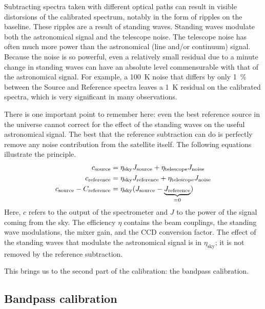 Subtracting spectra taken with different optical paths can result in visible distorsions of the calibrated spectrum, notably in the form of ripples on the baseline.
These ripples are a result of standing waves.
Standing waves modulate both the astronomical signal and the telescope noise.
The telescope noise has often much more power than the astronomical (line and/or continuum) signal.
Because the noise is so powerful, even a relatively small residual due to a minute change in standing waves can have an absolute level commensurable with that of the astronomical signal.
For example, a \SI{100}{\kelvin} noise that differs by only \SI{1}{\percent} between the Source and Reference spectra leaves a \SI{1}{\kelvin} residual on the calibrated spectra, which is very significant in many observations.

There is one important point to remember here: even the best reference source in the universe cannot correct for the effect of the standing waves on the useful astronomical signal.
The best that the reference subtraction can do is perfectly remove any noise contribution from the satellite itself.
The following equations illustrate the principle.
\begin{align}
    c_\text{source}    &= \eta_\text{sky} J_\text{source} + \eta_\text{telescope} J_\text{noise} \notag
    \\
    c_\text{reference} &= \eta_\text{sky} J_\text{reference} + \eta_\text{telescope} J_\text{noise} \notag
    \\
    c_\text{source} - C_\text{reference} &= \eta_\text{sky} (J_\text{source} - \underbrace{J_\text{reference}}_{=0}) \label{eq:remove_noise_only}
\end{align}
Here, $c$ refers to the output of the spectrometer and $J$ to the power of the signal coming from the sky.
The efficiency $\eta$ contains the beam couplings, the standing wave modulations, the mixer gain, and the CCD conversion factor.
The effect of the standing waves that modulate the astronomical signal is in $\eta_\text{sky}$; it is not removed by the reference subtraction.

This brings us to the second part of the calibration: the bandpass calibration.

\subsection{Bandpass calibration}

